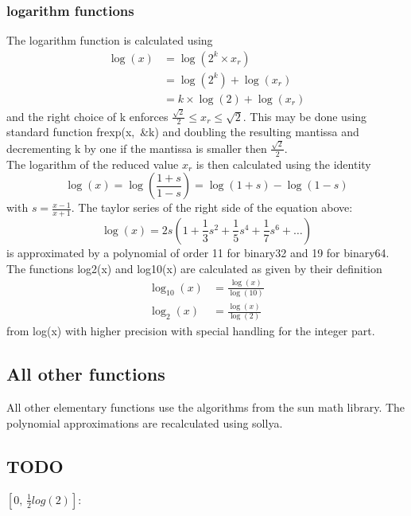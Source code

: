 \documentclass[10pt,a4paper,final,oneside]{article}
\numberwithin{equation}{subsection}
\begin{document}
\subsubsection{logarithm functions}
%
The logarithm function is calculated using
\begin{equation}
    \begin{aligned}
        \log(x) &= \log(2^k \times x_r)  \\
                &= \log(2^k) + \log(x_r)  \\
                &= k \times \log(2) + \log(x_r)
  \end{aligned}
\end{equation}
and the right choice of k enforces
$ \frac{\sqrt{2}}{2} \le x_r \le \sqrt{2} $.
This may be done using standard function \mbox{frexp(x, \&k)} and doubling
the resulting mantissa and decrementing k by one if the mantissa is
smaller then $\frac{\sqrt{2}}{2}$.\\[10pt]
%
The logarithm of the reduced value $x_r$ is then calculated using the
identity
\begin{equation}
  \log(x) = \log \left( \frac{1+s}{1-s} \right) = \log(1+s) - \log(1-s)
\end{equation}
with $  s= \frac{x-1}{x+1} $.
The taylor series of the right side of the equation above:
\begin{displaymath}
\log(x) = 2s
\left( 1 + \frac{1}{3} s^2 + \frac{1}{5} s^4 + \frac{1}{7} s^6 + \dots  \right)
\end{displaymath}
is approximated by a polynomial of order 11 for binary32 and 19 for binary64.
%
The functions log2(x) and log10(x) are calculated as given by their definition
\[
    \begin{aligned}
        \log_{10}(x) &= \frac{\log(x)}{\log(10)}\\
        \log_{2}(x) &= \frac{\log(x)}{\log(2)}
    \end{aligned}
\]
from log(x) with higher precision with special handling for the integer part.

\subsection{All other functions}

    All other elementary functions use the algorithms from the sun
    math library. The polynomial approximations are recalculated
    using sollya.

\subsection{TODO}
    $[0,\,\frac{1}{2}log(2)]$:
\end{document}
